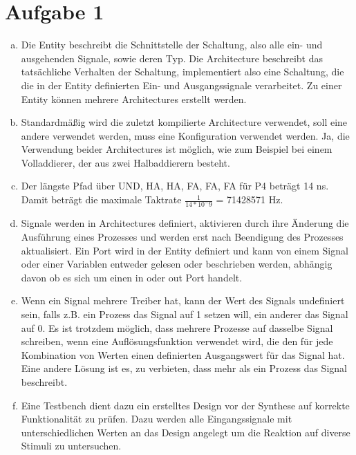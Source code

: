 \documentclass[a4paper]{scrartcl}
\begin{document}
	
	\section*{Aufgabe 1}
	
	\begin{enumerate}[(a)]
		\item Die Entity beschreibt die Schnittstelle der Schaltung, also alle ein- und ausgehenden Signale, sowie deren Typ. Die Architecture beschreibt das tatsächliche Verhalten der Schaltung, implementiert also eine Schaltung, die die in der Entity definierten Ein- und Ausgangssignale verarbeitet. Zu einer Entity können mehrere Architectures erstellt werden.
		
		\item Standardmäßig wird die zuletzt kompilierte Architecture verwendet, soll eine andere verwendet werden, muss eine Konfiguration verwendet werden. Ja, die Verwendung beider Architectures ist möglich, wie zum Beispiel bei einem Volladdierer, der aus zwei Halbaddierern besteht.
			
		\item Der längste Pfad über UND, HA, HA, FA, FA, FA für P4 beträgt 14 ns. Damit beträgt die maximale Taktrate $\frac{1}{14*10^-9}$ = 71428571 Hz.
		
		\item Signale werden in Architectures definiert, aktivieren durch ihre Änderung die Ausführung eines Prozesses und werden erst nach Beendigung des Prozesses aktualisiert. Ein Port wird in der Entity definiert und kann von einem Signal oder einer Variablen entweder gelesen oder beschrieben werden, abhängig davon ob es sich um einen in oder out Port handelt.
		
		\item Wenn ein Signal mehrere Treiber hat, kann der Wert des Signals undefiniert sein, falls z.B. ein Prozess das Signal auf 1 setzen will, ein anderer das Signal auf 0. Es ist trotzdem möglich, dass mehrere Prozesse auf dasselbe Signal schreiben, wenn eine Auflösungsfunktion verwendet wird, die den für jede Kombination von Werten einen definierten Ausgangswert für das Signal hat. Eine andere Lösung ist es, zu verbieten, dass mehr als ein Prozess das Signal beschreibt.
		
\item  Eine Testbench dient dazu ein erstelltes Design vor der Synthese auf korrekte Funktionalität zu prüfen. Dazu werden alle Eingangssignale mit unterschiedlichen Werten an das Design angelegt um die Reaktion auf diverse Stimuli zu untersuchen.		
	
	\end{enumerate}

	
\end{document}
